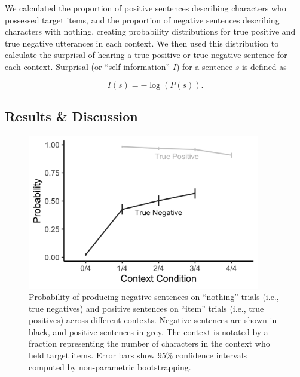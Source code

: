 \documentclass[man, floatsintext, noapacite]{apa6}
\begin{document}
We calculated the proportion of positive sentences describing characters who possessed target items, and the proportion of negative sentences describing characters with nothing, creating probability distributions for true positive and true negative utterances in each context.  We then used this distribution to calculate the surprisal of hearing a true positive or true negative sentence for each context. Surprisal (or ``self-information'' $I$) for a sentence $s$ is defined as

\begin{equation}
\label{eq:surprise}
I(s) = -\log(P(s)).
\end{equation}

\subsection{Results \& Discussion}

\begin{figure}[t]
\begin{center} 
\includegraphics[width=4in]{figures/experiment1/speaker_probs.png}
\caption{\label{fig:exp1_speakerprobs} Probability of producing negative sentences on ``nothing'' trials (i.e., true negatives) and positive sentences on ``item'' trials (i.e., true positives) across different contexts. Negative sentences are shown in black, and positive sentences in grey.  The context is notated by a fraction representing the number of characters in the context who held target items. Error bars show 95\% confidence intervals computed by non-parametric bootstrapping.  }
\end{center} 
\end{figure}
\end{document}
